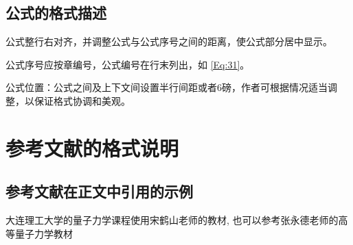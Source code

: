 \subsection{公式的格式描述}

\begin{asparaenum}[(1)]
\item 公式整行右对齐，并调整公式与公式序号之间的距离，使公式部分居中显示。

\item 公式序号应按章编号，公式编号在行末列出，如 \eqref{Eq:31}。

\item 公式位置：公式之间及上下文间设置半行间距或者6磅，作者可根据情况适当调整，以保证格式协调和美观。
\end{asparaenum}

\section{参考文献的格式说明}

\subsection{参考文献在正文中引用的示例}
大连理工大学的量子力学课程使用宋鹤山老师的教材\cite{BOOK.hssong2006},
也可以参考张永德老师的高等量子力学教材\cite{BOOK.Zhang2009}
